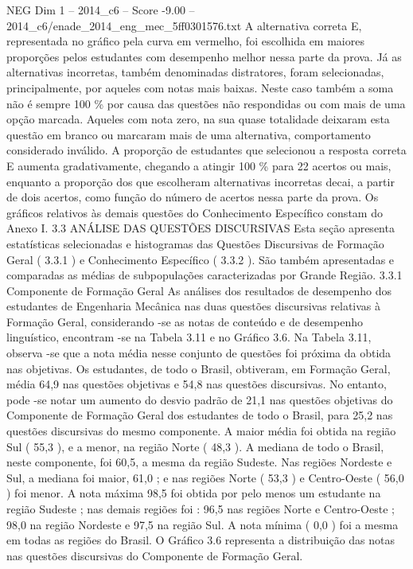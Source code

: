 \begin{textsample}{NEG Dim 1 – 2014\_c6 – Score -9.00 – 2014\_c6/enade\_2014\_eng\_mec\_5ff0301576.txt}
A alternativa correta E, representada no gráfico pela curva em vermelho, foi escolhida em maiores proporções pelos estudantes com desempenho melhor nessa parte da prova.
Já as alternativas incorretas, também denominadas distratores, foram selecionadas, principalmente, por aqueles com notas mais baixas.
Neste caso também a soma não é sempre 100 \% por causa das questões não respondidas ou com mais de uma opção marcada.
Aqueles com nota zero, na sua quase totalidade deixaram esta questão em branco ou marcaram mais de uma alternativa, comportamento considerado inválido.
A proporção de estudantes que selecionou a resposta correta E aumenta gradativamente, chegando a atingir 100 \% para 22 acertos ou mais, enquanto a proporção dos que escolheram alternativas incorretas decai, a partir de dois acertos, como função do número de acertos nessa parte da prova.
Os gráficos relativos às demais questões do Conhecimento Específico constam do Anexo I. 3.3 ANÁLISE DAS QUESTÕES DISCURSIVAS Esta seção apresenta estatísticas selecionadas e histogramas das Questões Discursivas de Formação Geral ( 3.3.1 ) e Conhecimento Específico ( 3.3.2 ).
São também apresentadas e comparadas as médias de subpopulações caracterizadas por Grande Região. 3.3.1 Componente de Formação Geral As análises dos resultados de desempenho dos estudantes de Engenharia Mecânica nas duas questões discursivas relativas à Formação Geral, considerando -se as notas de conteúdo e de desempenho linguístico, encontram -se na Tabela 3.11 e no Gráfico 3.6.
Na Tabela 3.11, observa -se que a nota média nesse conjunto de questões foi próxima da obtida nas objetivas.
Os estudantes, de todo o Brasil, obtiveram, em Formação Geral, média 64,9 nas questões objetivas e 54,8 nas questões discursivas.
No entanto, pode -se notar um aumento do desvio padrão de 21,1 nas questões objetivas do Componente de Formação Geral dos estudantes de todo o Brasil, para 25,2 nas questões discursivas do mesmo componente.
A maior média foi obtida na região Sul ( 55,3 ), e a menor, na região Norte ( 48,3 ).
A mediana de todo o Brasil, neste componente, foi 60,5, a mesma da região Sudeste.
Nas regiões Nordeste e Sul, a mediana foi maior, 61,0 ; e nas regiões Norte ( 53,3 ) e Centro-Oeste ( 56,0 ) foi menor.
A nota máxima 98,5 foi obtida por pelo menos um estudante na região Sudeste ; nas demais regiões foi : 96,5 nas regiões Norte e Centro-Oeste ; 98,0 na região Nordeste e 97,5 na região Sul.
A nota mínima ( 0,0 ) foi a mesma em todas as regiões do Brasil.
O Gráfico 3.6 representa a distribuição das notas nas questões discursivas do Componente de Formação Geral.

\end{textsample}
